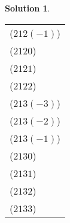 \documentclass[10pt]{article}
\theoremstyle{definition}
\newtheorem{soln}{Solution}
\begin{document}
\begin{soln}
\begin{table}[h!]
\begin{tabular}{l}
      ($21 2 (-1)$) \\
      ($21 2 0$)    \\
      ($21 2 1$)    \\
      ($21 2 2$)    \\
      ($21 3 (-3)$) \\
      ($21 3 (-2)$) \\
      ($21 3 (-1)$) \\
      ($21 3 0$)    \\
      ($21 3 1$)    \\
      ($21 3 2$)    \\
      ($21 3 3$)    \\
      \bottomrule
    \end{tabular}
  \end{table}
\end{soln}
\end{document}
